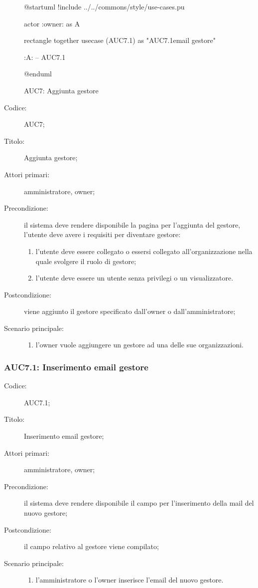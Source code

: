 \documentclass[../../../analisi-dei-requisiti.tex]{subfiles}
\begin{document}
\begin{figure}[H]
  \centering
  \begin{plantuml}
  @startuml
  !include ../../commons/style/use-cases.pu

  actor :owner: as A

  rectangle {
    together {
      usecase (AUC7.1) as "AUC7.1\nInserimento email gestore"
    }
  }

  :A: -- AUC7.1

  @enduml
  \end{plantuml}
  \caption{AUC7: Aggiunta gestore}%
  \label{fig:AUC7}
\end{figure}

\begin{description}
  \item[Codice:] AUC7;
  \item[Titolo:] Aggiunta gestore;
  \item[Attori primari:] amministratore, owner;
  \item[Precondizione:] il sistema deve rendere disponibile la pagina per l'aggiunta del gestore, l'utente deve avere i requisiti per diventare gestore:
  \begin{enumerate}
    \item l'utente deve essere collegato o essersi collegato all'organizzazione nella quale svolgere il ruolo di gestore;
    \item l'utente deve essere un utente senza privilegi o un visualizzatore.
  \end{enumerate}
  \item[Postcondizione:] viene aggiunto il gestore specificato dall'owner o dall'amministratore;
  \item[Scenario principale:]
  \begin{enumerate}
    \item l'owner vuole aggiungere un gestore ad una delle sue organizzazioni.
  \end{enumerate}
\end{description}

\subsubsection{AUC7.1: Inserimento email gestore}%
\label{subs:AUC7.1}
\begin{description}
  \item[Codice:] AUC7.1;
  \item[Titolo:] Inserimento email gestore;
  \item[Attori primari:] amministratore, owner;
  \item[Precondizione:] il sistema deve rendere disponibile il campo per l'inserimento della mail del nuovo gestore;
  \item[Postcondizione:] il campo relativo al gestore viene compilato;
  \item[Scenario principale:]
  \begin{enumerate}
    \item l'amministratore o l'owner inserisce l'email del nuovo gestore.
  \end{enumerate}
\end{description}
\end{document}

